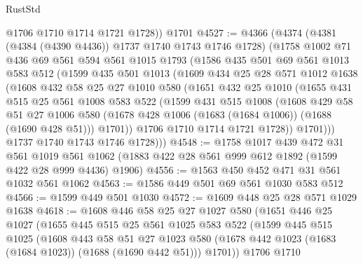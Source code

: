 \begin{lexlean}{RustStd}
\begin{coremodule}
        @1706
        @1710
        @1714
        @1721
        @1728))
    @1701
@4527 := @4366
    (@4374
      (@4381 (@4384 (@4390 @4436)) @1737 @1740 @1743 @1746 @1728)
      (@1758
        @1002
        @71
        @436
        @69
        @561
        @594
        @561
        @1015
        @1793
        (@1586
          @435
          @501
          @69
          @561
          @1013
          @583
          @512
          (@1599
            @435
            @501
            @1013
            (@1609
              @434
              @25
              @28
              @571
              @1012
              @1638
              (@1608
                @432
                @58
                @25
                @27
                @1010
                @580
                (@1651
                  @432
                  @25
                  @1010
                  (@1655
                    @431
                    @515
                    @25
                    @561
                    @1008
                    @583
                    @522
                    (@1599
                      @431
                      @515
                      @1008
                      (@1608
                        @429
                        @58
                        @51
                        @27
                        @1006
                        @580
                        (@1678 @428 @1006 (@1683 (@1684 @1006)) (@1688 (@1690 @428 @51)))
                        @1701))
                    @1706
                    @1710
                    @1714
                    @1721
                    @1728))
                @1701)))
          @1737
          @1740
          @1743
          @1746
          @1728)))
@4548 := @1758
    @1017
    @439
    @472
    @31
    @561
    @1019
    @561
    @1062
    (@1883 @422 @28 @561 @999 @612 @1892 (@1599 @422 @28 @999 @4436) @1906)
@4556 := @1563 @450 @452 @471 @31 @561 @1032 @561 @1062
@4563 := @1586 @449 @501 @69 @561 @1030 @583 @512
@4566 := @1599 @449 @501 @1030
@4572 := @1609 @448 @25 @28 @571 @1029 @1638
@4618 := @1608
    @446
    @58
    @25
    @27
    @1027
    @580
    (@1651
      @446
      @25
      @1027
      (@1655
        @445
        @515
        @25
        @561
        @1025
        @583
        @522
        (@1599
          @445
          @515
          @1025
          (@1608
            @443
            @58
            @51
            @27
            @1023
            @580
            (@1678 @442 @1023 (@1683 (@1684 @1023)) (@1688 (@1690 @442 @51)))
            @1701))
        @1706
        @1710

\end{coremodule}
\end{lexlean}
